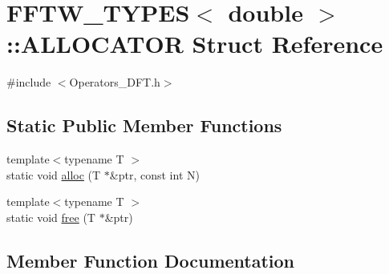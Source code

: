 \hypertarget{struct_f_f_t_w___t_y_p_e_s_3_01double_01_4_1_1_a_l_l_o_c_a_t_o_r}{}\section{F\+F\+T\+W\+\_\+\+T\+Y\+P\+E\+S$<$ double $>$\+:\+:A\+L\+L\+O\+C\+A\+T\+O\+R Struct Reference}
\label{struct_f_f_t_w___t_y_p_e_s_3_01double_01_4_1_1_a_l_l_o_c_a_t_o_r}


{\ttfamily \#include $<$Operators\+\_\+\+D\+F\+T.\+h$>$}

\subsection*{Static Public Member Functions}
\begin{DoxyCompactItemize}
\item 
{\footnotesize template$<$typename T $>$ }\\static void \hyperlink{struct_f_f_t_w___t_y_p_e_s_3_01double_01_4_1_1_a_l_l_o_c_a_t_o_r_a6aa6d310b910598052c1808e955cc61d}{alloc} (T $\ast$\&ptr, const int N)
\item 
{\footnotesize template$<$typename T $>$ }\\static void \hyperlink{struct_f_f_t_w___t_y_p_e_s_3_01double_01_4_1_1_a_l_l_o_c_a_t_o_r_a11fc14281b39486977303a12df68afe4}{free} (T $\ast$\&ptr)
\end{DoxyCompactItemize}


\subsection{Member Function Documentation}
\hypertarget{struct_f_f_t_w___t_y_p_e_s_3_01double_01_4_1_1_a_l_l_o_c_a_t_o_r_a6aa6d310b910598052c1808e955cc61d}{}
